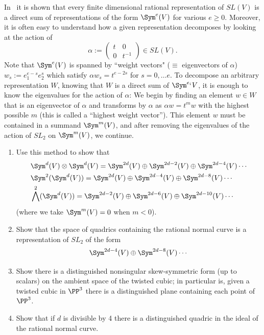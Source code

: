 \begin{exercise}
In~\cite[pp. 146--150]{Fulton-Harris} it is shown that
 every finite dimensional rational 
representation of $SL(V)$ is a direct sum of representations of the form $\Sym^e(V)$ for various $e\geq 0$. Moreover, it is often easy to understand
how a given representation decomposes by looking at the action of
$$
\alpha := \begin{pmatrix}
t&0\\
0&t^{-1}
\end{pmatrix}
\in SL(V).
$$
Note that $\Sym^e(V)$ is spanned by ``weight vectors" ($\equiv$ eigenvectors of $\alpha$) $w_s := e_1^{e-s} e_2^{s}$ 
which satisfy $\alpha w_s = t^{e-2s}$ for $s = 0, \dots e$.
To decompose an arbitrary representation $W$, knowing that $W$ is a direct sum of $\Sym^{e_i}V$, it is enough to know the 
eigenvalues for the action of $\alpha$: We begin by finding an element $w\in W$ that
is an eigenvector of $\alpha$ and transforms by $\alpha$ as $\alpha w = t^mw$ with the highest possible $m$ (this is called a ``highest weight vector''). This element $w$ must be contained
in a summand $\Sym^m(V)$, and after removing the eigenvalues of the action of $SL_2$ on $\Sym^m(V)$, we continue. 
\begin{enumerate}
 \item Use this method to show that 
\begin{align*}
&\Sym^d(V)\otimes \Sym^d(V)= \Sym^{2d}(V) \oplus  \Sym^{2d-2}(V) \oplus \Sym^{2d-4}(V) \cdots\\
 &\Sym^2(\Sym^d(V))= \Sym^{2d}(V) \oplus \Sym^{2d-4}(V)\oplus \Sym^{2d-8}(V) \cdots\\
 &\bigwedge^2(\Sym^d(V))= \Sym^{2d-2}(V) \oplus \Sym^{2d-6}(V)\oplus \Sym^{2d-10}(V) \cdots
\end{align*}
  (where we take $\Sym^{m}(V)=0$ when $m<0$).
 \item Show that the space of quadrics containing the rational normal curve is a representation of $SL_2$ of the form
 $$
 \Sym^{2d-4}(V)\oplus \Sym^{2d-8}(V) \cdots
 $$
  \item Show  there is a distinguished nonsingular skew-symmetric form (up to scalars) on the ambient space of the twisted cubic; in particular
  is, given a twisted cubic in $\PP^3$ there is a distinguished plane containing each point of $\PP^3$.
 \item Show that if $d$ is divisible by 4 there is a distinguished quadric in the ideal of the rational normal curve.
\end{enumerate}
\end{exercise}

